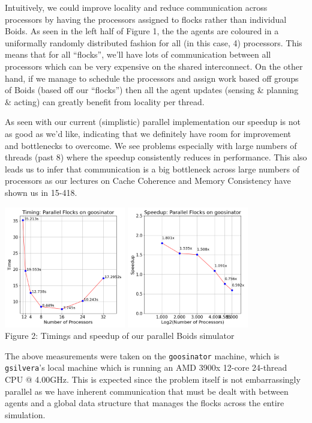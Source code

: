 \documentclass[12pt]{article}
\begin{document}
\par Intuitively, we could improve locality and reduce communication across processors by having the processors assigned to flocks rather than individual Boids. As seen in the left half of Figure 1, the the agents are coloured in a uniformally randomly distributed fashion for all (in this case, 4) processors. This means that for all ``flocks'', we'll have lots of communication between all processors which can be very expensive on the shared interconnect. On the other hand, if we manage to schedule the processors and assign work based off groups of Boids (based off our ``flocks'') then all the agent updates (sensing \& planning \& acting) can greatly benefit from locality per thread. 
\par As seen with our current (simplistic) parallel implementation our speedup is not as good as we'd like, indicating that we definitely have room for improvement and bottlenecks to overcome. We see problems especially with large numbers of threads (past 8) where the speedup consistently reduces in performance. This also leads us to infer that communication is a big bottleneck across large numbers of processors as our lectures on Cache Coherence and Memory Consistency have shown us in 15-418. 
\begin{center}
    \includegraphics[width=200px]{figures/Time_ParallelFlocks_goosinator.png}
    \includegraphics[width=200px]{figures/Speedup_ParallelFlocks_goosinator.png}\\
    Figure 2: Timings and speedup of our parallel Boids simulator
\end{center}
\par The above measurements were taken on the \texttt{goosinator} machine, which is \texttt{gsilvera}'s local machine which is running an AMD 3900x 12-core 24-thread CPU @ 4.00GHz. This is expected since the problem itself is not embarrassingly parallel as we have inherent communication that must be dealt with between agents and a global data structure that manages the flocks across the entire simulation.
\end{document}
